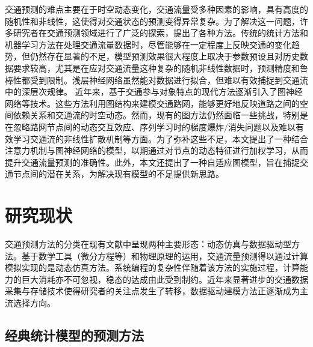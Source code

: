 交通预测的难点主要在于时空动态变化，交通流量受多种因素的影响，具有高度的随机性和非线性，这使得对交通状态的预测变得异常复杂。为了解决这一问题，许多研究者在交通预测领域进行了广泛的探索，提出了各种方法。传统的统计方法和机器学习方法在处理交通流量数据时，尽管能够在一定程度上反映交通的变化趋势，但仍然存在显著的不足，模型预测效果很大程度上取决于参数预设且对历史数据要求较高，尤其是在应对交通流量这种复杂的随机非线性数据时，预测精度和鲁棒性都受到限制。浅层神经网络虽然能对数据进行拟合，但难以有效捕捉到交通流中的深层次规律。
近年来，基于交通参与对象特点的现代方法逐渐引入了图神经网络等技术。这些方法利用图结构来建模交通路网，能够更好地反映道路之间的空间依赖关系和交通流的时空动态。然而，现有的图方法仍然面临一些挑战，特别是在忽略路网节点间的动态交互效应、序列学习时的梯度爆炸/消失问题以及难以有效学习交通流的非线性扩散机制等方面。为了弥补这些不足，本文提出了一种结合注意力机制与图神经网络的模型，以期通过对节点的动态特征进行加权学习，从而提升交通流量预测的准确性。此外，本文还提出了一种自适应图模型，旨在捕捉交通节点间的潜在关系，为解决现有模型的不足提供新思路。

\section{研究现状}

交通预测方法的分类在现有文献中呈现两种主要形态：动态仿真与数据驱动型方法。基于数学工具（微分方程等）和物理原理的运用，交通流量预测得以通过计算模拟实现的是动态仿真方法\parencite{2015_Vlahogianni_Computational_intelligence_and_optimization_for_transportation_big_data_challenges_and_opportunities}。系统编程的复杂性伴随着该方法的实施过程，计算能力的巨大消耗亦不可忽视，稳态的达成由此受到制约。近年来显著进步的交通数据采集与存储技术使得研究者的关注点发生了转移，数据驱动建模方法正逐渐成为主流选择方向。
\subsection{经典统计模型的预测方法}

